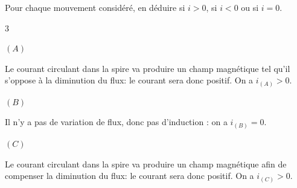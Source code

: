 

\pauseEntrainement

\medskip

Pour chaque mouvement considéré, en déduire si $i>0$, si $i<0$ ou si $i=0$.

\hauteurLargeurCadreReponse		{8mm}{2cm}


\repriseEntrainement

\begin{multicols}{3}


\begin{enonce}
$(A)$
\end{enonce}
\begin{corrige}
Le courant circulant dans la spire va produire un champ magnétique
tel qu'il s'oppose à la diminution du flux: le courant sera donc positif. On a $i_{(A)}>0$.
\end{corrige}




\begin{enonce}
$(B)$
\end{enonce}
\begin{corrige}
Il n'y a pas de variation de flux, donc pas d'induction : on a $i_{(B)}=0$.
\end{corrige}




\begin{enonce}
$(C)$
\end{enonce}
\begin{corrige}
Le courant circulant dans la spire va produire un champ magnétique
afin de compenser la diminution du flux: le courant sera donc positif. On a $i_{(C)}>0$.
\end{corrige}


\end{multicols}

